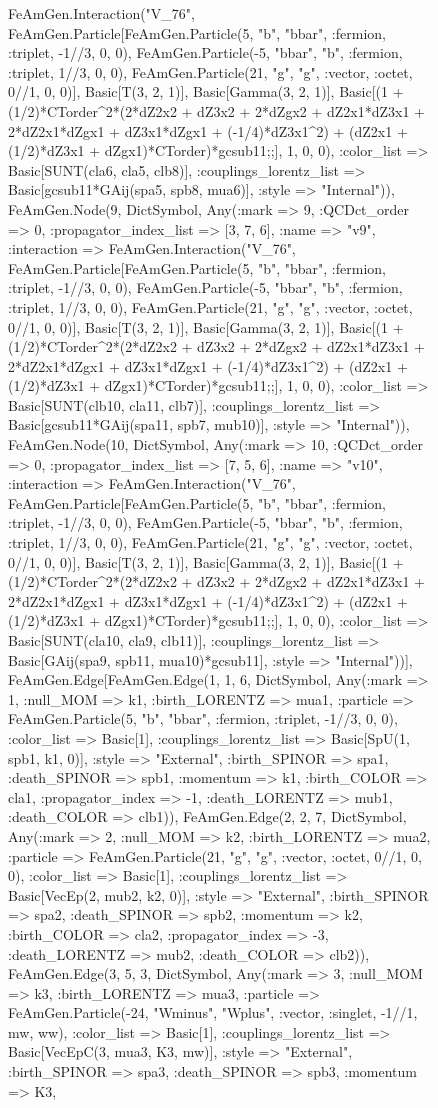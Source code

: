 \documentclass{revtex4}
\begin{document}
\begin{figure}[!htb]
\begin{center}
{FeAmGen.Interaction("V_76", FeAmGen.Particle[FeAmGen.Particle(5, "b", "bbar", :fermion, :triplet, -1//3, 0, 0), FeAmGen.Particle(-5, "bbar", "b", :fermion, :triplet, 1//3, 0, 0), FeAmGen.Particle(21, "g", "g", :vector, :octet, 0//1, 0, 0)], Basic[T(3, 2, 1)], Basic[Gamma(3, 2, 1)], Basic[(1 + (1/2)*CTorder^2*(2*dZ2x2 + dZ3x2 + 2*dZgx2 + dZ2x1*dZ3x1 + 2*dZ2x1*dZgx1 + dZ3x1*dZgx1 + (-1/4)*dZ3x1^2) + (dZ2x1 + (1/2)*dZ3x1 + dZgx1)*CTorder)*gcsub11;;], 1, 0, 0), :color_list => Basic[SUNT(cla6, cla5, clb8)], :couplings_lorentz_list => Basic[gcsub11*GAij(spa5, spb8, mua6)], :style => "Internal")), FeAmGen.Node(9, Dict{Symbol, Any}(:mark => 9, :QCDct_order => 0, :propagator_index_list => [3, 7, 6], :name => "v9", :interaction => FeAmGen.Interaction("V_76", FeAmGen.Particle[FeAmGen.Particle(5, "b", "bbar", :fermion, :triplet, -1//3, 0, 0), FeAmGen.Particle(-5, "bbar", "b", :fermion, :triplet, 1//3, 0, 0), FeAmGen.Particle(21, "g", "g", :vector, :octet, 0//1, 0, 0)], Basic[T(3, 2, 1)], Basic[Gamma(3, 2, 1)], Basic[(1 + (1/2)*CTorder^2*(2*dZ2x2 + dZ3x2 + 2*dZgx2 + dZ2x1*dZ3x1 + 2*dZ2x1*dZgx1 + dZ3x1*dZgx1 + (-1/4)*dZ3x1^2) + (dZ2x1 + (1/2)*dZ3x1 + dZgx1)*CTorder)*gcsub11;;], 1, 0, 0), :color_list => Basic[SUNT(clb10, cla11, clb7)], :couplings_lorentz_list => Basic[gcsub11*GAij(spa11, spb7, mub10)], :style => "Internal")), FeAmGen.Node(10, Dict{Symbol, Any}(:mark => 10, :QCDct_order => 0, :propagator_index_list => [7, 5, 6], :name => "v10", :interaction => FeAmGen.Interaction("V_76", FeAmGen.Particle[FeAmGen.Particle(5, "b", "bbar", :fermion, :triplet, -1//3, 0, 0), FeAmGen.Particle(-5, "bbar", "b", :fermion, :triplet, 1//3, 0, 0), FeAmGen.Particle(21, "g", "g", :vector, :octet, 0//1, 0, 0)], Basic[T(3, 2, 1)], Basic[Gamma(3, 2, 1)], Basic[(1 + (1/2)*CTorder^2*(2*dZ2x2 + dZ3x2 + 2*dZgx2 + dZ2x1*dZ3x1 + 2*dZ2x1*dZgx1 + dZ3x1*dZgx1 + (-1/4)*dZ3x1^2) + (dZ2x1 + (1/2)*dZ3x1 + dZgx1)*CTorder)*gcsub11;;], 1, 0, 0), :color_list => Basic[SUNT(cla10, cla9, clb11)], :couplings_lorentz_list => Basic[GAij(spa9, spb11, mua10)*gcsub11], :style => "Internal"))], FeAmGen.Edge[FeAmGen.Edge(1, 1, 6, Dict{Symbol, Any}(:mark => 1, :null_MOM => k1, :birth_LORENTZ => mua1, :particle => FeAmGen.Particle(5, "b", "bbar", :fermion, :triplet, -1//3, 0, 0), :color_list => Basic[1], :couplings_lorentz_list => Basic[SpU(1, spb1, k1, 0)], :style => "External", :birth_SPINOR => spa1, :death_SPINOR => spb1, :momentum => k1, :birth_COLOR => cla1, :propagator_index => -1, :death_LORENTZ => mub1, :death_COLOR => clb1)), FeAmGen.Edge(2, 2, 7, Dict{Symbol, Any}(:mark => 2, :null_MOM => k2, :birth_LORENTZ => mua2, :particle => FeAmGen.Particle(21, "g", "g", :vector, :octet, 0//1, 0, 0), :color_list => Basic[1], :couplings_lorentz_list => Basic[VecEp(2, mub2, k2, 0)], :style => "External", :birth_SPINOR => spa2, :death_SPINOR => spb2, :momentum => k2, :birth_COLOR => cla2, :propagator_index => -3, :death_LORENTZ => mub2, :death_COLOR => clb2)), FeAmGen.Edge(3, 5, 3, Dict{Symbol, Any}(:mark => 3, :null_MOM => k3, :birth_LORENTZ => mua3, :particle => FeAmGen.Particle(-24, "Wminus", "Wplus", :vector, :singlet, -1//1, mw, ww), :color_list => Basic[1], :couplings_lorentz_list => Basic[VecEpC(3, mua3, K3, mw)], :style => "External", :birth_SPINOR => spa3, :death_SPINOR => spb3, :momentum => K3, }
\end{center}
\end{figure}
\end{document}
